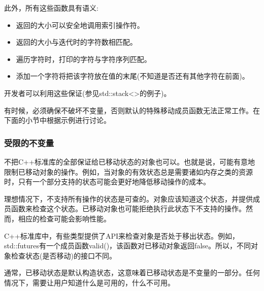 此外，所有这些函数具有语义:

\begin{itemize}
	\item 返回的大小可以安全地调用索引操作符。
	\item 返回的大小与迭代时的字符数相匹配。
	\item 遍历字符时，打印的字符与字符序列匹配。
	\item 添加一个字符将把该字符放在值的末尾(不知道是否还有其他字符在前面)。
\end{itemize}

开发者可以利用这些保证(参见std::stack<>的例子)。

有时候，必须确保不破坏不变量，否则默认的特殊移动成员函数无法正常工作。在下面的小节中根据示例进行讨论。

\subsubsection{受限的不变量}

不把C++标准库的全部保证给已移动状态的对象也可以。也就是说，可能有意地限制已移动对象的操作。例如，当对象的有效状态总是需要诸如内存之类的资源时，只有一个部分支持的状态可能会更好地降低移动操作的成本。

理想情况下，不支持所有操作的状态是可查的。对象应该知道这个状态，并提供成员函数来检查这个状态。已移动对象也可能拒绝执行此状态下不支持的操作。然而，相应的检查可能会影响性能。

C++标准库中，有些类型提供了API来检查对象是否处于移出状态。例如，std::futures有一个成员函数valid()，该函数对已移动对象返回false。所以，不同对象检查状态(是否移动)的接口不同。

通常，已移动状态是默认构造状态，这意味着已移动状态是不变量的一部分。任何情况下，需要让用户知道什么是可用的，什么不可用。




